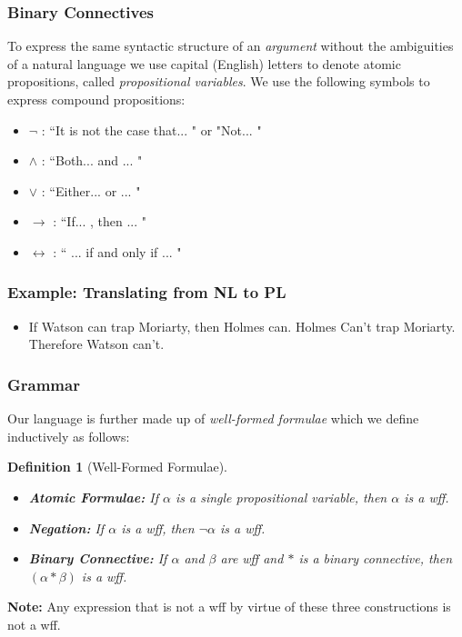 \documentclass{beamer}
\theoremstyle{indentDefn} \newtheorem{defn}[]{Definition}
\begin{document}
\begin{frame}
	\frametitle{Binary Connectives}
	
	To express the same syntactic structure of an \emph{argument} without the ambiguities of a natural language we use capital (English) letters to denote atomic propositions, called \emph{propositional variables}. We use the following symbols to express compound propositions: 
	
	\vspace{0.5cm}
	
	\begin{itemize}
		\item $\lnot$ : ``It is not the case that... " or "Not... "
		\item $\land$ : ``Both... and ... " 
		\item $\lor$ : ``Either... or ... "
		\item $\rightarrow$ : ``If... , then ... "
		\item $\leftrightarrow$ : `` ... if and only if ... "
	\end{itemize}
	
\end{frame}

\begin{frame}
	\frametitle{Example: Translating from NL to PL}
	\begin{itemize}
		\item If Watson can trap Moriarty, then Holmes can. Holmes Can't trap Moriarty. Therefore Watson can't.
	\end{itemize}
	
	\vspace{5cm}
	
	
	
	
	
	
\end{frame}	

\begin{frame}
	\frametitle{Grammar}
	
	Our language is further made up of \emph{well-formed formulae} which we define inductively as follows:	
	
	\vspace{0.5cm}
	\begin{defn}[Well-Formed Formulae]
	\begin{itemize}
		\item {\bf Atomic Formulae:} If $\alpha$ is a single propositional variable, then $\alpha$ is a wff.
		\item {\bf Negation:} If $\alpha$ is a wff, then $\lnot\alpha$ is a wff. 
		\item {\bf Binary Connective:} If $\alpha$ and $\beta$ are wff and $*$ is a binary connective, then $(\alpha * \beta)$ is a wff. 		
	\end{itemize}
	\end{defn}
	
	\vspace{0.5cm}	
	
	{\bf Note:} Any expression that is not a wff by virtue of these three constructions is not a wff. 
	
\end{frame}
\end{document}
